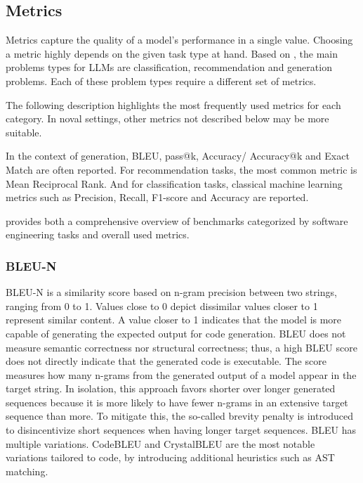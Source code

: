 \documentclass[11pt]{article}
\begin{document}
\subsection{Metrics}
Metrics capture the quality of a model's performance in a single value.
Choosing a metric highly depends on the given task type at hand.
Based on \cite{10.1145/3695988}, the main problems types for LLMs are classification, recommendation and generation problems.
Each of these problem types require a different set of metrics.

The following description highlights the most frequently used metrics for each category.
In noval settings, other metrics not described below may be more suitable. %

In the context of generation, BLEU, pass@k, Accuracy/ Accuracy@k and Exact Match are often reported.
For recommendation tasks, the most common metric is Mean Reciprocal Rank.
And for classification tasks, classical machine learning metrics such as Precision, Recall, F1-score and Accuracy are reported.

\cite{10.1145/3695988} provides both a comprehensive overview of benchmarks categorized by software engineering tasks and overall used metrics.

\subsubsection{BLEU-N}

BLEU-N \cite{DBLP:conf/acl/PapineniRWZ02} is a similarity score based on n-gram precision between two strings, ranging from 0 to 1.
Values close to 0 depict dissimilar values closer to 1 represent similar content.
A value closer to 1 indicates that the model is more capable of generating the expected output for code generation.
BLEU does not measure semantic correctness nor structural correctness; thus, a high BLEU score does not directly indicate that the generated code is executable.
The score measures how many n-grams from the generated output of a model appear in the target string.
In isolation, this approach favors shorter over longer generated sequences because it is more likely to have fewer n-grams in an extensive target sequence than more.
To mitigate this, the so-called brevity penalty is introduced to disincentivize short sequences when having longer target sequences.
BLEU has multiple variations.
CodeBLEU \cite{DBLP:journals/corr/abs-2009-10297} and CrystalBLEU \cite{DBLP:conf/kbse/EghbaliP22} are the most notable variations tailored to code, by introducing additional heuristics such as AST matching.
\end{document}
